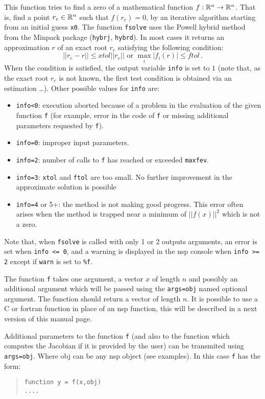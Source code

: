 \begin{mandescription}
This function tries to find a zero of a mathematical function $f: {\mathbb R}^n \rightarrow  {\mathbb R}^n$.
That is, find a point $r_e \in {\mathbb R}^n$ such that $f(r_e)=0$, by an iterative algorithm starting from an initial guess \verb+x0+.
The function \verb+fsolve+ uses the Powell hybrid method from the Minpack package (\verb+hybrj+, \verb+hybrd+). 
In most cases it returns an approximation $r$ of an exact root $r_e$ satisfying the following condition:  
$$
|| r_e - r || \le xtol || r_e || \mbox{ or } \max_i | f_i(r) | \le ftol\,.
$$
When the condition is satisfied, the output variable \verb+info+ is set to $1$ (note that, as the exact root  $r_e$
is not known, the first test condition is obtained via an estimation \ldots). Other possible values
for \verb+info+ are:
\begin{itemize}
\item \verb+info<0+: execution aborted because of a problem in the evaluation of the given function \verb+f+ 
  (for example, error in the code of \verb+f+ or missing additional parameters requested by \verb+f+).
\item \verb+info=0+: improper input parameters.
\item \verb+info=2+: number of calls to \verb+f+ has reached or exceeded \verb+maxfev+.
\item \verb+info=3+: \verb+xtol+ and \verb+ftol+ are too small. No further improvement in the approximate solution is possible
\item \verb+info=4+ or \verb++5+: the method is not making good progress. This error often arises when the method
  is trapped near a minimum of $||f(x)||^2$ which is not a zero.
\end{itemize}
Note that, when \verb+fsolve+ is called with only 1 or 2 outputs arguments, an error is set 
when \verb+info <= 0+, and a warning is displayed in the nsp console when \verb+info >= 2+ except 
if \verb+warn+ is set to \verb+%f+. 

The function \verb+f+ takes one argument, a vector $x$ of length $n$ and possibly an additional
argument which will be passed using the \verb+args=obj+ named optional argument. The function
should return a vector of length $n$. It is possible to use a C or fortran function in place
of an nsp function, this will be described in a next version of this manual page.

Additional parameters to the function \verb+f+ (and also to the function which computes the Jacobian 
if it is provided by the user) can be transmited using \verb+args=obj+. Where obj can be any nsp 
object (see examples). In this case \verb+f+ has the form:
\begin{quote}
{\tt function y = f(x,obj) \\
      ....}
\end{quote}


\end{mandescription}

